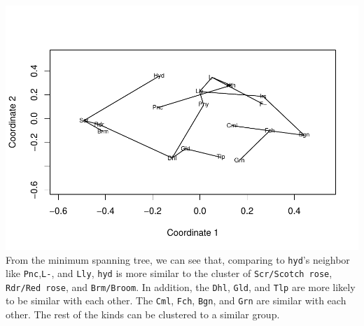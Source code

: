 \documentclass[
]{article}
\begin{document}
\includegraphics{HUDM6122-Homework_04-Chenguang-Pan_files/figure-latex/unnamed-chunk-15-1.pdf}
From the minimum spanning tree, we can see that, comparing to
\texttt{hyd}'s neighbor like \texttt{Pnc},\texttt{L-}, and \texttt{Lly},
\texttt{hyd} is more similar to the cluster of
\texttt{Scr/Scotch\ rose}, \texttt{Rdr/Red\ rose}, and
\texttt{Brm/Broom}. In addition, the \texttt{Dhl}, \texttt{Gld}, and
\texttt{Tlp} are more likely to be similar with each other. The
\texttt{Cml}, \texttt{Fch}, \texttt{Bgn}, and \texttt{Grn} are similar
with each other. The rest of the kinds can be clustered to a similar
group.
\end{document}

